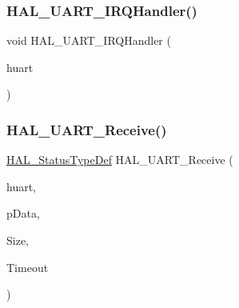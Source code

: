 \subsubsection{\texorpdfstring{H\+A\+L\+\_\+\+U\+A\+R\+T\+\_\+\+I\+R\+Q\+Handler()}{HAL\_UART\_IRQHandler()}}
{\footnotesize\ttfamily void H\+A\+L\+\_\+\+U\+A\+R\+T\+\_\+\+I\+R\+Q\+Handler (\begin{DoxyParamCaption}\item[{\hyperlink{group___u_a_r_t___exported___types_ga7adf4f3e4c3ecde572be5925c915a967}{U\+A\+R\+T\+\_\+\+Handle\+Type\+Def} $\ast$}]{huart }\end{DoxyParamCaption})}

\mbox{\label{group___u_a_r_t___exported___functions___group2_gab868edc590e3b827a14528a25c999e2f}} 
\subsubsection{\texorpdfstring{H\+A\+L\+\_\+\+U\+A\+R\+T\+\_\+\+Receive()}{HAL\_UART\_Receive()}}
{\footnotesize\ttfamily \hyperlink{stm32f4xx__hal__def_8h_a63c0679d1cb8b8c684fbb0632743478f}{H\+A\+L\+\_\+\+Status\+Type\+Def} H\+A\+L\+\_\+\+U\+A\+R\+T\+\_\+\+Receive (\begin{DoxyParamCaption}\item[{\hyperlink{group___u_a_r_t___exported___types_ga7adf4f3e4c3ecde572be5925c915a967}{U\+A\+R\+T\+\_\+\+Handle\+Type\+Def} $\ast$}]{huart,  }\item[{uint8\+\_\+t $\ast$}]{p\+Data,  }\item[{uint16\+\_\+t}]{Size,  }\item[{uint32\+\_\+t}]{Timeout }\end{DoxyParamCaption})}

\mbox{\label{group___u_a_r_t___exported___functions___group2_gad674cce054e58927720cd689620ffa08}} 
